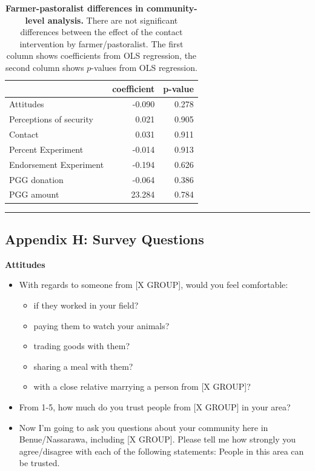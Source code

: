 \documentclass[
]{article}
\providecommand{\tightlist}{%
  \setlength{\itemsep}{0pt}\setlength{\parskip}{0pt}}
\begin{document}
\begin{table}[H]
\begin{center}
\label{tab:farm_tab}
\caption{\textbf{Farmer-pastoralist differences in community-level analysis.} There are not significant differences between the effect of the contact intervention by farmer/pastoralist. The first column shows coefficients from OLS regression, the second column shows $p$-values from OLS regression.}
\smallskip

\begin{tabular}{l|r|r}
\hline
  & coefficient & p-value\\
\hline
Attitudes & -0.090 & 0.278\\
\hline
Perceptions of security & 0.021 & 0.905\\
\hline
Contact & 0.031 & 0.911\\
\hline
Percent Experiment & -0.014 & 0.913\\
\hline
Endorsement Experiment & -0.194 & 0.626\\
\hline
PGG donation & -0.064 & 0.386\\
\hline
PGG amount & 23.284 & 0.784\\
\hline
\end{tabular}


\end{center}
\end{table}

\begin{center}\rule{0.5\linewidth}{0.5pt}\end{center}

\hypertarget{appendix-h-survey-questions}{%
\subsection{Appendix H: Survey
Questions}\label{appendix-h-survey-questions}}

\textbf{Attitudes}

\begin{itemize}
\tightlist
\item
  With regards to someone from {[}X GROUP{]}, would you feel
  comfortable:

  \begin{itemize}
  \tightlist
  \item
    if they worked in your field?
  \item
    paying them to watch your animals?
  \item
    trading goods with them?
  \item
    sharing a meal with them?
  \item
    with a close relative marrying a person from {[}X GROUP{]}?
  \end{itemize}
\item
  From 1-5, how much do you trust people from {[}X GROUP{]} in your
  area?
\item
  Now I'm going to ask you questions about your community here in
  Benue/Nassarawa, including {[}X GROUP{]}. Please tell me how strongly
  you agree/disagree with each of the following statements: People in
  this area can be trusted.
\end{itemize}
\end{document}
